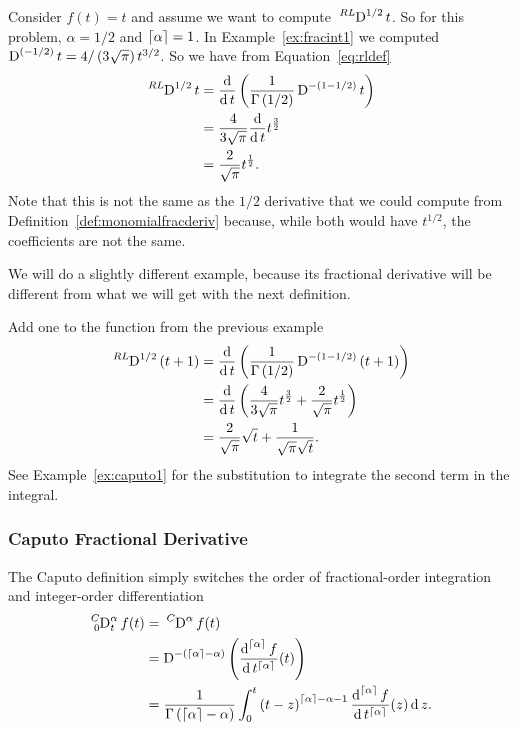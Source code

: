\begin{example}
Consider $f(t) = t$ and assume we want to compute $\tensor*[^{RL}]{\D}{^{1/2}}t$. So for this problem, $\alpha = 1/2$
and $\left\lceil \alpha \right\rceil = 1$.  In Example~\ref{ex:fracint1} we computed $\tensor*[]{\D}{^{(-1/2)}}t=4/\left(3 \sqrt{\pi}\right)
t^{3/2}$. So we have from Equation~\ref{eq:rldef}
\begin{align*}
\tensor*[^{RL}]{\D}{^{1/2}} t &= \frac{\d}{\d t} \left( \frac{1}{\Gamma \left( 1/2 \right)} \tensor*[]{\D}{^{-(1-1/2)}}
 t\right)
\\
&=  \frac{4}{3 \sqrt{\pi}} \frac{\d}{\d t} t^\frac{3}{2} \\
&= \frac{2}{\sqrt{\pi}} t^\frac{1}{2}.
\end{align*}
Note that this is not the same as the $1/2$ derivative that we could compute from Definition~\ref{def:monomialfracderiv}
because, while both would have $t^{1/2}$, the coefficients are not the same.
\label{ex:fracderiv1}
\end{example}

We will do a slightly different example, because its fractional derivative will be different from what we will get with
the next definition.

\begin{example}
Add one to the function from the previous example
\begin{align*}
\tensor*[^{RL}]{\D}{^{1/2}} \left( t + 1 \right) &= \frac{\d}{\d t} \left( \frac{1}{\Gamma \left( 1/2 \right)}
\tensor*[]{\D}{^{-(1-1/2)}} \left( t + 1 \right) \right)
\\
&=  \frac{\d}{\d t} \left( \frac{4}{3 \sqrt{\pi}} t^\frac{3}{2} +  \frac{2}{\sqrt{\pi}} t^\frac{1}{2} \right)\\
&= \frac{2}{\sqrt{\pi}} \sqrt{t} + \frac{1}{\sqrt{\pi} \sqrt{t}}. 
\end{align*}
See Example~\ref{ex:caputo1} for the substitution to integrate the second term in the integral.
\label{ex:fracderiv2}
\end{example}


\subsubsection{Caputo Fractional Derivative}
The Caputo definition simply switches the order of fractional-order integration and integer-order differentiation
\begin{equation}
  \begin{aligned}
  \tensor*[^{C}_0]{\D}{^\alpha_t}  f(t) &= \tensor*[^{C}]{\D}{^\alpha} f(t) \\
  &= \tensor*[]{\D}{^{-\left( \lc \alpha \rc - \alpha \right)}} \left( \frac{\d^{\lc \alpha \rc} f}{\d t^{\lc \alpha \rc}}(t) \right) \\ 
    &= 
    \frac{1}{\Gamma\left(\lc \alpha \rc - \alpha \right)} \int_0^t \left( t - z \right)^{\lc \alpha \rc - \alpha - 1}  \frac{\d^{\lc \alpha \rc}f}{\d t^{\lc \alpha \rc}} (z) \d z. 
  \end{aligned}
  \label{eq:caputodef}
\end{equation}

